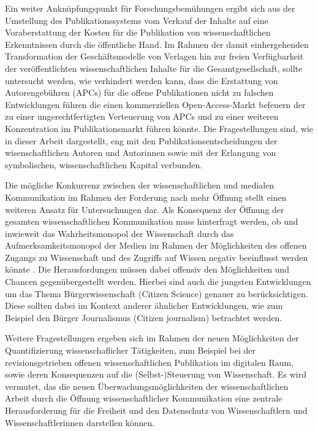 Ein weiter Anknüpfungspunkt für Forschungsbemühungen ergibt sich aus der Umstellung des Publikationssystems vom Verkauf der Inhalte auf eine Voraberstattung der Kosten für die Publikation von wissenschaftlichen Erkenntnissen durch die öffentliche Hand. Im Rahmen der damit einhergehenden Transformation der Geschäftsmodelle von Verlagen hin zur freien Verfügbarkeit der veröffentlichten wissenschaftlichen Inhalte für die Gesamtgesellschaft, sollte untersucht werden, wie verhindert werden kann, dass die Erstattung von Autorengebühren (APCs) für die offene Publikationen nicht zu falschen Entwicklungen führen die einen kommerziellen Open-Access-Markt befeuern der zu einer ungerechtfertigten Verteuerung von APCs und zu einer weiteren Konzentration im Publikationsmarkt führen könnte. Die Fragestellungen sind, wie in dieser Arbeit dargestellt, eng mit den Publikationsentscheidungen der wisenschaftlichen Autoren und Autorinnen sowie mit der Erlangung von symbolischen, wissenschaftlichen Kapital verbunden.

Die mögliche Konkurrenz zwischen der wissenschaftlichen und medialen Kommunikation im Rahmen der Forderung nach mehr Öffnung stellt einen weiteren Ansatz für Untersuchungen dar. Als Konsequenz der Öffnung der gesamten wissenschaftlichen Kommunikation muss hinterfragt werden, ob und inwieweit das Wahrheitsmonopol der Wissenschaft durch das Aufmerksamkeitsmonopol der Medien im Rahmen der Möglichkeiten des offenen Zugangs zu Wissenschaft und des Zugriffs auf Wissen negativ beeinflusst werden könnte \cite{weingart_2005_wissenschaft}. Die Herausfordungen müssen dabei offensiv den Möglichkeiten und Chancen gegenübergestellt werden. Hierbei sind auch die jungsten Entwicklungen um das Thema Bürgerwissenschaft (Citizen Science) genauer zu berücksichtigen. Diese sollten dabei im Kontext anderer ähnlicher Entwicklungen, wie zum Beispiel den Bürger Journalismus (Citizen journalism) betrachtet werden.

Weitere Fragestellungen ergeben sich im Rahmen der neuen Möglichkeiten der Quantifizierung wissenschaflicher Tätigkeiten, zum Beispiel bei der revisionsgetrieben offenen wissenschaftlichen Publikation im digitalen Raum, sowie deren Konsequenzen auf die (Selbst-)Steuerung von Wissenschaft. Es wird vermutet, das die neuen Überwachungsmöglichkeiten der wissenschaftlichen Arbeit durch die Öffnung wissenschaftlicher Kommunikation eine zentrale Herausforderung für die Freiheit und den Datenschutz von Wissenschaftlern und Wissenschaftlerinnen darstellen können.
